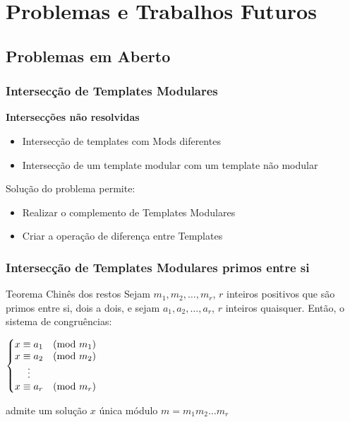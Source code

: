 \documentclass[aspectratio=43,hyperref={pdfpagelabels=false}]{beamer}
\begin{document}
 \section{Problemas e Trabalhos Futuros}
 \subsection*{Problemas em Aberto}
 \begin{frame}
    \frametitle{Intersecção de Templates Modulares}

    \textbf{Intersecções não resolvidas}
    \begin{itemize}
      \item Intersecção de templates com Mods diferentes
      \item Intersecção de um template modular com um template não modular
    \end{itemize}

    \begin{alertblock}{Solução do problema permite:}
        \vspace{-0.4cm}
        \begin{itemize}
          \item Realizar o complemento de Templates Modulares 
          \item Criar a operação de diferença entre Templates
        \end{itemize}
    \end{alertblock}
 \end{frame}


\begin{frame}
    \frametitle{Intersecção de Templates Modulares primos entre si}
    \begin{alertblock}{Teorema Chinês dos restos}
    \vspace{-0.4cm}    
    \label{chinese}
    Sejam $m_1,m_2,\dots,m_r$, $r$ inteiros positivos que são primos entre si, dois a dois, e sejam $a_1,a_2,\dots,a_r$, $r$ inteiros quaisquer. Então, o sistema de congruências:
    
    $
        \left\{\begin{matrix}
        x \equiv a_1 & (\textup{mod }m_1) \\ 
        x \equiv a_2 & (\textup{mod }m_2) \\
        \vdots \\
        x \equiv a_r & (\textup{mod }m_r) \\
        \end{matrix}\right.    
    $

    admite um solução $x$ única módulo $m = m_1 m_2 \dots m_r$
    \end{alertblock}
\end{frame} 
\end{document}
